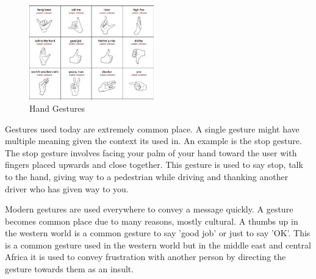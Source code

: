 \begin{figure}
  \begin{center}
    \includegraphics[width=0.48\textwidth]{img/handgesture.png}
  \end{center}
  \caption{Hand Gestures}
\end{figure}

Gestures used today are extremely common place.  A single gesture might have multiple meaning given the context its used in. An example is the stop gesture. The stop gesture involves facing your palm of your hand toward the user with fingers placed upwards and close together. This gesture is used to say stop, talk to the hand, giving way to a pedestrian while driving and thanking another driver who has given way to you.

Modern gestures are used everywhere to convey a message quickly. A gesture becomes common place due to many reasons, mostly cultural. A thumbs up in the western world is a common gesture to say 'good job' or just to say 'OK'. This is a common gesture used in the western world but in the middle east and central Africa it is used to convey frustration with another person by directing the gesture towards them as an insult.

